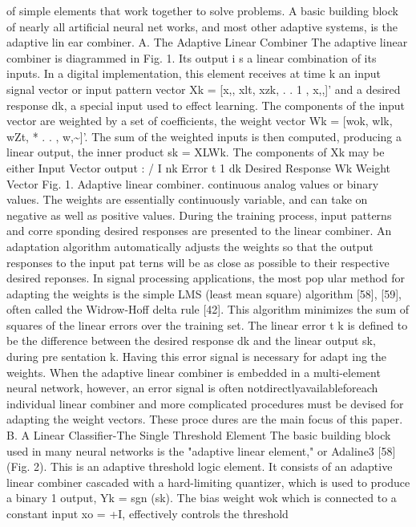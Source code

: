 \documentclass[11pt,a4paper,twocolumn]{article}
\begin{document}
of simple elements that work together to solve problems. 
A basic building block of nearly all artificial neural net
works, and most other adaptive systems, is the adaptive lin
ear combiner. 
A. The Adaptive Linear Combiner 
The adaptive linear combiner is diagrammed in Fig. 1. Its 
output i s  a linear combination of its inputs. In a digital 
implementation, this element receives at time k an input 
signal vector or input pattern vector Xk = [x,, xlt, xzk, 
. . 
1 , x,,]' 
and a desired response dk, a special input used 
to effect learning. The components of the input vector are 
weighted by a set of coefficients, the weight vector Wk = 
[wok, wlk, wZt, * . . , w,\~{}]'. 
The sum of the weighted inputs 
is then computed, producing a linear output, the inner 
product sk = XLWk. The components of Xk may be either 
Input 
Vector 
output 
:
/
 I 
nk 
Error 
t 
1 
dk 
Desired Response 
Wk 
Weight Vector 
Fig. 1. Adaptive linear combiner. 
continuous analog values or binary values. The weights are 
essentially continuously variable, and can take on negative 
as well as positive values. 
During the training process, input patterns and corre
sponding desired responses are presented to the linear 
combiner. An adaptation algorithm automatically adjusts 
the weights so that the output responses to the input pat
terns will be as close as possible to their respective desired 
reponses. In signal processing applications, the most pop
ular method for adapting the weights is the simple LMS 
(least mean square) algorithm [58], [59], often called the 
Widrow-Hoff delta rule [42]. This algorithm minimizes the 
sum of squares of the linear errors over the training set. The 
linear error t k  is defined to be the difference between the 
desired response dk and the linear output sk, during pre
sentation k. Having this error signal is necessary for adapt
ing the weights. When the adaptive linear combiner is 
embedded in a multi-element neural network, however, an 
error signal is often notdirectlyavailableforeach individual 
linear combiner and more complicated procedures must 
be devised for adapting the weight vectors. These proce
dures are the main focus of this paper. 
B. A Linear Classifier-The Single Threshold Element 
The basic building block used in many neural networks 
is the "adaptive linear element," or Adaline3 [58] (Fig. 2). 
This is an adaptive threshold logic element. It consists of 
an adaptive linear combiner cascaded with a hard-limiting 
quantizer, which is used to produce a binary 
1 output, 
Yk = sgn (sk). The bias weight wok which is connected to a 
constant input xo = +I, effectively controls the threshold 
\end{document}
